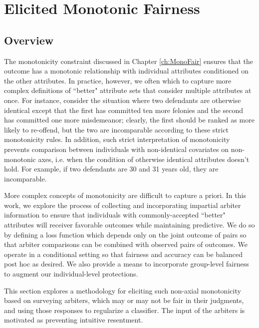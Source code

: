 \chapter{Elicited Monotonic Fairness} \label{ch:SoftMonoFair}

\newcommand{\xc}{c}

\section{Overview}

    The monotonicity constraint discussed in Chapter \ref{ch:MonoFair} ensures that the outcome has a monotonic relationship with individual attributes conditioned on the other attributes.  In practice, however, we often which to capture more complex definitions of ``better" attribute sets that consider multiple attributes at once.  For instance, consider the situation where two defendants are otherwise identical except that the first has committed ten more felonies and the second has committed one more misdemeanor; clearly, the first should be ranked as more likely to re-offend, but the two are incomparable according to these strict monotonicity rules.  In addition, such strict interpretation of monotonicity prevents comparison between individuals with non-identical covariates on non-monotonic axes, i.e. when the condition of otherwise identical attributes doesn't hold.  For example, if two defendants are 30 and 31 years old, they are incomparable.
    
    More complex concepts of monotonicity are difficult to capture a priori.  In this work, we explore the process of collecting and incorporating impartial arbiter information to ensure that individuals with commonly-accepted ``better" attributes will receiver favorable outcomes while maintaining predictive.  We do so by defining a loss function which depends only on the joint outcome of pairs so that arbiter comparisons can be combined with observed pairs of outcomes.  We operate in a conditional setting so that fairness and accuracy can be balanced post hoc as desired.    We also provide a means to incorporate group-level fairness to augment our individual-level protections.
    
    This section explores a methodology for eliciting such non-axial monotonicity based on surveying arbiters, which may or may not be fair in their judgments, and using those responses to regularize a classifier.  The input of the arbiters is motivated as preventing intuitive resentment. 

